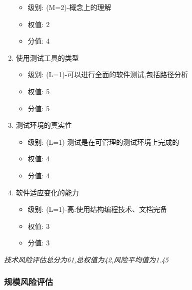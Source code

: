 \documentclass[hyperref, a4paper]{ctexart}
\providecommand{\tightlist}{%
  \setlength{\itemsep}{0pt}\setlength{\parskip}{0pt}}
\begin{document}
\begin{enumerate}
  \begin{itemize}
  \tightlist
  \item
    级别: (M=2)-概念上的理解
  \item
    权值: 2
  \item
    分值: 4
  \end{itemize}
\item
  使用测试工具的类型

  \begin{itemize}
  \tightlist
  \item
    级别: (L=1)-可以进行全面的软件测试,包括路径分析
  \item
    权值: 5
  \item
    分值: 5
  \end{itemize}
\item
  测试环境的真实性

  \begin{itemize}
  \tightlist
  \item
    级别: (L=1)-测试是在可管理的测试环境上完成的
  \item
    权值: 4
  \item
    分值: 4
  \end{itemize}
\item
  软件适应变化的能力

  \begin{itemize}
  \tightlist
  \item
    级别: (L=1)-高:使用结构编程技术、文档完备
  \item
    权值: 3
  \item
    分值: 3
  \end{itemize}
\end{enumerate}

\emph{技术风险评估总分为61,总权值为42,风险平均值为1.45}

\hypertarget{ux89c4ux6a21ux98ceux9669ux8bc4ux4f30}{%
\subsubsection{规模风险评估}\label{ux89c4ux6a21ux98ceux9669ux8bc4ux4f30}}
\end{document}
